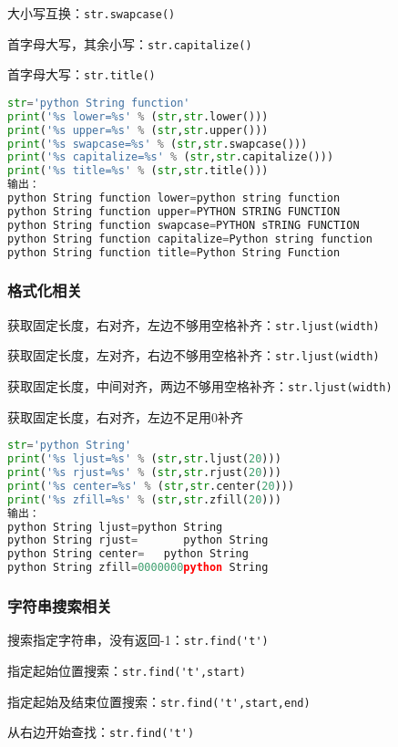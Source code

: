 大小写互换：\verb|str.swapcase()|

首字母大写，其余小写：\verb|str.capitalize()|

首字母大写：\verb|str.title()|

\begin{lstlisting}[language=python]
str='python String function'
print('%s lower=%s' % (str,str.lower()))
print('%s upper=%s' % (str,str.upper()))
print('%s swapcase=%s' % (str,str.swapcase()))
print('%s capitalize=%s' % (str,str.capitalize()))
print('%s title=%s' % (str,str.title()))
输出：
python String function lower=python string function
python String function upper=PYTHON STRING FUNCTION
python String function swapcase=PYTHON sTRING FUNCTION
python String function capitalize=Python string function
python String function title=Python String Function
\end{lstlisting}
\subsubsection{格式化相关}
获取固定长度，右对齐，左边不够用空格补齐：\verb|str.ljust(width)|

获取固定长度，左对齐，右边不够用空格补齐：\verb|str.ljust(width)|

获取固定长度，中间对齐，两边不够用空格补齐：\verb|str.ljust(width)|

获取固定长度，右对齐，左边不足用0补齐

\begin{lstlisting}[language=python]
str='python String'
print('%s ljust=%s' % (str,str.ljust(20)))
print('%s rjust=%s' % (str,str.rjust(20)))
print('%s center=%s' % (str,str.center(20)))
print('%s zfill=%s' % (str,str.zfill(20)))
输出：
python String ljust=python String       
python String rjust=       python String
python String center=   python String    
python String zfill=0000000python String

\end{lstlisting}

\subsubsection{字符串搜索相关}
搜索指定字符串，没有返回-1：\verb|str.find('t')|

指定起始位置搜索：\verb|str.find('t',start)|

指定起始及结束位置搜索：\verb|str.find('t',start,end)|

从右边开始查找：\verb|str.find('t')|

